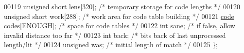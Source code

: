 \begin{DoxyCode}
00119     \textcolor{keywordtype}{unsigned} \textcolor{keywordtype}{short} lens[320];   \textcolor{comment}{/* temporary storage for code lengths */}
00120     \textcolor{keywordtype}{unsigned} \textcolor{keywordtype}{short} work[288];   \textcolor{comment}{/* work area for code table building */}
00121     \hyperlink{structcode}{code} codes[ENOUGH];         \textcolor{comment}{/* space for code tables */}
00122     \textcolor{keywordtype}{int} sane;                   \textcolor{comment}{/* if false, allow invalid distance too far */}
00123     \textcolor{keywordtype}{int} back;                   \textcolor{comment}{/* bits back of last unprocessed length/lit */}
00124     \textcolor{keywordtype}{unsigned} was;               \textcolor{comment}{/* initial length of match */}
00125 \};
\end{DoxyCode}
